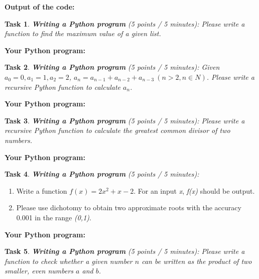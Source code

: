 \documentclass[UTF8]{ctexart}
\newtheorem{task}{Task}
\begin{document}
\noindent
\textbf{Output of the code:}
\vspace{1cm}

\begin{task}
{\textbf{Writing a Python program}} (5 points / 5 minutes): Please write a function to find the maximum value of a given list. 
\end{task}

\noindent
\textbf{Your Python program:}
\vspace{4cm}

\begin{task}
{\textbf{Writing a Python program}} (5 points / 5 minutes): Given $a_0=0,a_1=1,a_2=2$, $a_n=a_{n-1}+a_{n-2}+a_{n-3}~(n>2,n\in N)$. Please write a recursive Python function to calculate $a_n$.
\end{task}

\noindent
\textbf{Your Python program:}
\vspace{4cm}

\begin{task}
{\textbf{Writing a Python program}} (5 points / 5 minutes): Please write a recursive Python function to calculate the greatest common divisor of two numbers.
\end{task}

\noindent
\textbf{Your Python program:}
\vspace{4cm}





\begin{task}
{\textbf{Writing a Python program}} (5 points / 5 minutes):
\end{task}
\begin{enumerate}
    \item Write a function $f(x)=2x^2+x-2$. For an input \emph{x}, \emph{f(x)} should be output.
    \item Please use dichotomy to obtain two approximate roots with the accuracy 0.001 in the range \emph{(0,1)}.
\end{enumerate} 

\noindent
\textbf{Your Python program:}
\vspace{7cm}


\begin{task}
{\textbf{Writing a Python program}} (5 points / 5 minutes): Please write a function to check whether a given number $n$ can be written as the product of two smaller, even numbers $a$ and $b$.
\end{task}
\end{document}
